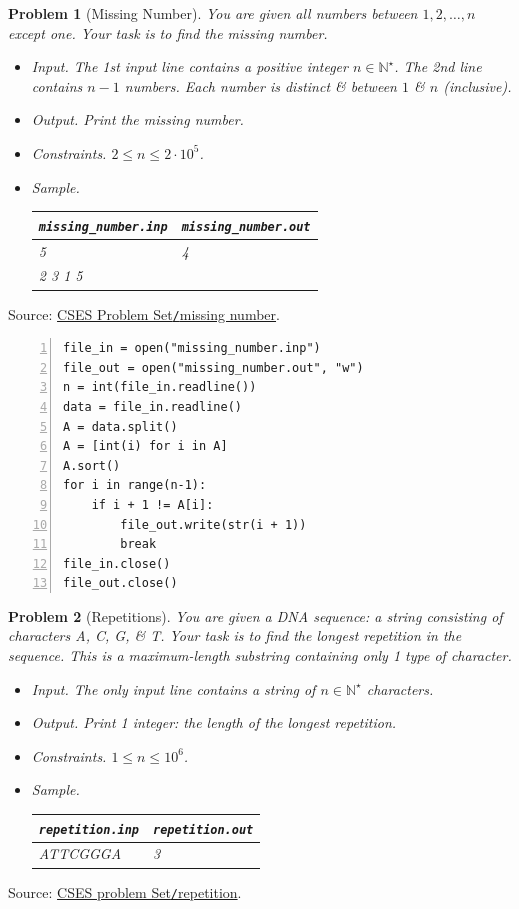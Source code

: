 \documentclass{article}
\newtheorem{problem}{Problem}
\begin{document}
\begin{problem}[Missing Number]
	You are given all numbers between $1,2,\ldots,n$ except one. Your task is to find the missing number.
	\begin{itemize}
		\item {\sf Input.} The 1st input line contains a positive integer $n\in\mathbb{N}^\star$. The 2nd line contains $n - 1$ numbers. Each number is distinct \& between $1$ \& $n$ (inclusive).
		\item {\sf Output.} Print the missing number.
		\item {\sf Constraints.} $2\le n\le2\cdot10^5$.
		\item {\sf Sample.}
		\begin{table}[H]
			\centering
			\begin{tabular}{|l|l|}
				\hline
				\verb|missing_number.inp| & \verb|missing_number.out| \\
				\hline
				5 & 4 \\
				2 3 1 5 & \\
				\hline
			\end{tabular}
		\end{table}
	\end{itemize}
\end{problem}
Source: \href{https://cses.fi/problemset/task/1083}{CSES Problem Set{\tt /}missing number}.

\begin{Verbatim}[numbers=left,xleftmargin=5mm]
file_in = open("missing_number.inp")
file_out = open("missing_number.out", "w")
n = int(file_in.readline())
data = file_in.readline()
A = data.split()
A = [int(i) for i in A]
A.sort()
for i in range(n-1):
    if i + 1 != A[i]:
        file_out.write(str(i + 1))
        break
file_in.close()
file_out.close()
\end{Verbatim}

\begin{problem}[Repetitions]
	You are given a DNA sequence: a string consisting of characters A, C, G, \& T. Your task is to find the longest repetition in the sequence. This is a maximum-length substring containing only 1 type of character.
	\begin{itemize}
		\item {\sf Input.} The only input line contains a string of $n\in\mathbb{N}^\star$ characters.
		\item {\sf Output.} Print 1 integer: the length of the longest repetition.
		\item {\sf Constraints.} $1\le n\le10^6$.
		\item {\sf Sample.}
		\begin{table}[H]
			\centering
			\begin{tabular}{|l|l|}
				\hline
				\verb|repetition.inp| & \verb|repetition.out| \\
				\hline
				ATTCGGGA & 3 \\
				\hline
			\end{tabular}
		\end{table}
	\end{itemize}	
\end{problem}
Source: \href{https://cses.fi/problemset/task/1069}{CSES problem Set{\tt /}repetition}.
\end{document}
